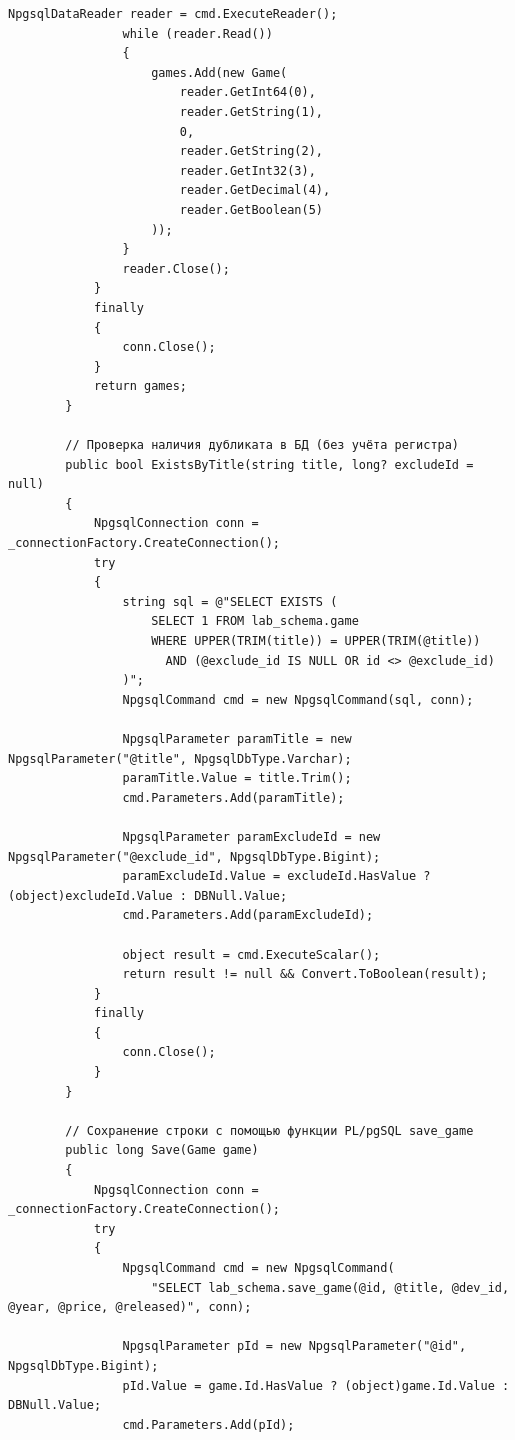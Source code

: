 \documentclass[oneside,a4paper,14pt]{extarticle}
\begin{document}
\begin{lstlisting}[language={[Sharp]C}]
                NpgsqlDataReader reader = cmd.ExecuteReader();
                while (reader.Read())
                {
                    games.Add(new Game(
                        reader.GetInt64(0),
                        reader.GetString(1),
                        0,
                        reader.GetString(2),
                        reader.GetInt32(3),
                        reader.GetDecimal(4),
                        reader.GetBoolean(5)
                    ));
                }
                reader.Close();
            }
            finally
            {
                conn.Close();
            }
            return games;
        }

        // Проверка наличия дубликата в БД (без учёта регистра)
        public bool ExistsByTitle(string title, long? excludeId = null)
        {
            NpgsqlConnection conn = _connectionFactory.CreateConnection();
            try
            {
                string sql = @"SELECT EXISTS (
                    SELECT 1 FROM lab_schema.game
                    WHERE UPPER(TRIM(title)) = UPPER(TRIM(@title))
                      AND (@exclude_id IS NULL OR id <> @exclude_id)
                )";
                NpgsqlCommand cmd = new NpgsqlCommand(sql, conn);

                NpgsqlParameter paramTitle = new NpgsqlParameter("@title", NpgsqlDbType.Varchar);
                paramTitle.Value = title.Trim();
                cmd.Parameters.Add(paramTitle);

                NpgsqlParameter paramExcludeId = new NpgsqlParameter("@exclude_id", NpgsqlDbType.Bigint);
                paramExcludeId.Value = excludeId.HasValue ? (object)excludeId.Value : DBNull.Value;
                cmd.Parameters.Add(paramExcludeId);

                object result = cmd.ExecuteScalar();
                return result != null && Convert.ToBoolean(result);
            }
            finally
            {
                conn.Close();
            }
        }

        // Сохранение строки с помощью функции PL/pgSQL save_game
        public long Save(Game game)
        {
            NpgsqlConnection conn = _connectionFactory.CreateConnection();
            try
            {
                NpgsqlCommand cmd = new NpgsqlCommand(
                    "SELECT lab_schema.save_game(@id, @title, @dev_id, @year, @price, @released)", conn);

                NpgsqlParameter pId = new NpgsqlParameter("@id", NpgsqlDbType.Bigint);
                pId.Value = game.Id.HasValue ? (object)game.Id.Value : DBNull.Value;
                cmd.Parameters.Add(pId);


\end{lstlisting}
\end{document}
